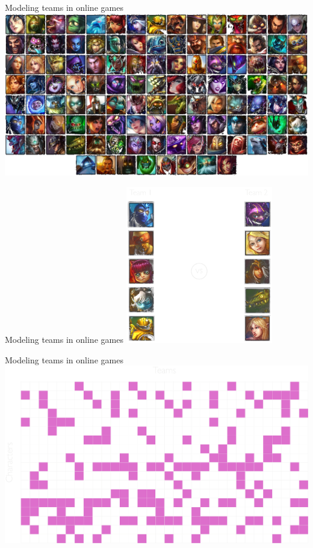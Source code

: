 \documentclass[mathserif]{beamer}
\begin{document}
\begin{frame}{Modeling teams in online games}
\vspace{1em}
\includegraphics[width=\textwidth]{figures/lol_champs.png}\\
\end{frame}


\begin{frame}{Modeling teams in online games}
\centering
\includegraphics[height=2.7in]{figures/champions5v5.pdf}
\end{frame}


\begin{frame}{Modeling teams in online games}
\centering
\includegraphics[width=\textwidth]{figures/grid_hots.pdf}
\end{frame}
\end{document}
